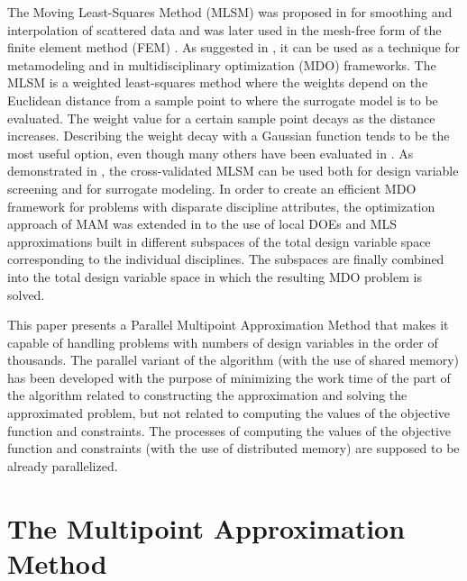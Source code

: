\documentclass[a4paper]{llncs}
\begin{document}
The Moving Least-Squares Method (MLSM) was proposed in
\cite{LancasterSalkauskas1981} for smoothing and interpolation of scattered
data and was later used in the mesh-free form of the finite element method
(FEM) \cite{Liszka1984}. As suggested in \cite{ChoiYounYang2001}, it can be
used as a technique for metamodeling and in multidisciplinary optimization
(MDO) frameworks. The MLSM is a weighted least-squares method where the weights
depend on the Euclidean distance from a sample point to where the surrogate
model is to be evaluated. The weight value for a certain sample point decays as
the distance increases. Describing the weight decay with a Gaussian function
tends to be the most useful option, even though many others have been evaluated
in \cite{ToropovSchrammSahaiJones2005}. As demonstrated in
\cite{PolynkinToropov2010}, the cross-validated MLSM can be used both for
design variable screening and for surrogate modeling. In order to create an
efficient MDO framework for problems with disparate discipline attributes, the
optimization approach of MAM was extended  in \cite{OllarToropovJones2014} to
the use of local DOEs and MLS approximations built in different subspaces of
the total design variable space corresponding to the individual disciplines.
The subspaces are finally combined into the total design variable space in
which the resulting MDO problem is solved.

This paper presents a Parallel Multipoint Approximation Method that makes it
capable of handling problems with numbers of design variables in the order of
thousands. The parallel variant of the algorithm (with the use of shared
memory) has been developed with the purpose of minimizing the work time of the
part of the algorithm related to constructing the approximation and solving the
approximated problem, but not related to computing the values of the objective
function and constraints. The processes of computing the values of the
objective function and constraints (with the use of distributed memory) are
supposed to be already parallelized.

\section{The Multipoint Approximation Method}
\label{sec:MAM}
\end{document}
